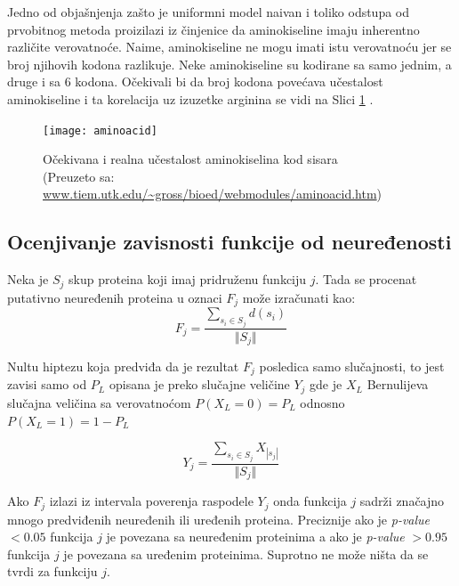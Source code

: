 Jedno od objašnjenja zašto je uniformni model naivan i toliko odstupa od
prvobitnog metoda proizilazi iz činjenice da aminokiseline imaju inherentno
različite verovatnoće. Naime, aminokiseline ne mogu  imati istu
verovatnoću jer se  broj njihovih kodona razlikuje. Neke aminokiseline
su kodirane sa samo jednim, a druge i sa 6 kodona. Očekivali bi da broj kodona
povećava učestalost aminokiseline i ta korelacija uz izuzetke arginina se vidi
na Slici \ref{fig:aminoacid} \parencite{AKfrekvencija}.

\begin{figure}[th]
\centering
\texttt{[image: aminoacid]}
\decoRule
\caption{Očekivana i realna učestalost  aminokiselina kod sisara\\ \footnotesize
(Preuzeto sa: \url{www.tiem.utk.edu/~gross/bioed/webmodules/aminoacid.htm})}
\label{fig:aminoacid}
\end{figure}



\subsection{Ocenjivanje zavisnosti funkcije od neuređenosti}

Neka je $S_j$ skup proteina koji imaj pridruženu funkciju $j$. Tada se procenat
putativno neuređenih proteina u oznaci $F_j$ može izračunati kao: $$F_j =
\dfrac{\sum_{s_i \in S_j} d(s_i)} {\Vert S_j \Vert} $$

Nultu hiptezu koja predviđa da je rezultat $F_j$ posledica samo slučajnosti, to
jest zavisi samo od $P_L$ opisana je preko slučajne veličine $Y_j$
gde je $X_L$ Bernulijeva slučajna veličina sa verovatnoćom $P(X_L = 0) = P_L$
odnosno $P(X_L = 1) = 1-P_L$

$$ Y_j = \dfrac {\sum_{s_i \in S_j} {X_{|s_j|}}}{\Vert S_j \Vert}$$

Ako $F_j$ izlazi iz intervala poverenja raspodele $Y_j$ onda funkcija $j$
sadrži značajno mnogo predviđenih neuređenih ili uređenih proteina. Preciznije
ako je \textit{p-value} $<0.05$ funkcija $j$ je povezana sa neuređenim
proteinima a ako je \textit{p-value} $>0.95$ funkcija $j$ je povezana sa
uređenim proteinima. Suprotno ne može ništa da se tvrdi za funkciju $j$.

